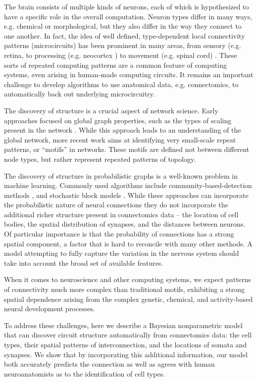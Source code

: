 \documentclass{article}
\begin{document}
The brain consists of multiple kinds of neurons, each of which is
hypothesized to have a specific role in the overall
computation. Neuron types differ in many ways, e.g. chemical or
morphological, but they also differ in the way they connect to one
another. In fact, the idea of well defined, type-dependent local
connectivity patterns (microcircuits) has been prominent in many
areas, from sensory (e.g. retina, \autocite{Masland2001} to processing
(e.g. neocortex \autocite{Mountcastle1997}) to movement (e.g. spinal
cord) \autocite{Grillner2005}. These sorts of repeated computing
patterns are a common feature of computing systems, even arising in
human-made computing circuits. It remains an important challenge to
develop algorithms to use anatomical data, e.g. connectomics, to
automatically back out underlying microcircuitry.

The discovery of structure is a crucial aspect of network
science. Early approaches focused on global graph properties, such as
the types of scaling present in the network \autocite
{WattsStrogatz1998}.  While this approach leads to an understanding
of the global network, more recent work aims at identifying very small-scale
repeat patterns, or “motifs” in networks\autocite{Milo2002}. These motifs
are defined not between different node types, but rather represent repeated
patterns of topology. 

The discovery of structure in probabilistic graphs is a well-known
problem in machine learning. Commonly used algorithms include
community-based-detection methods \autocite{Girvan2002}, and
stochastic block models \autocite{Nowicki2001}.  While these
approaches can incorporate the probabilistic nature of neural
connections \autocite{Hill2012} they do not incorporate the additional
richer structure present in connectomics data -- the location of cell
bodies, the spatial distribution of synapses, and the distances
between neurons. Of particular importance is that the probability of
connections has a strong spatial component, a factor that is hard to
reconcile with many other methods. A model attempting to fully capture
the variation in the nervous system should take into account the broad
set of available features.

When it comes to neuroscience and other computing systems, we expect
patterns of connectivity much more complex than traditional motifs,
exhibiting a strong spatial dependence arising from the complex
genetic, chemical, and activity-based neural development processes.

To address these challenges, here we describe a Bayesian
nonparametric model that can discover circuit structure automatically
from connectomics data: the cell types, their spatial patterns of
interconnection, and the locations of somata and synapses. We show
that by incorporating this additional information, our model both
accurately predicts the connection as well as agrees
with human neuroanatomists as to the identification of cell types.  
\end{document}

